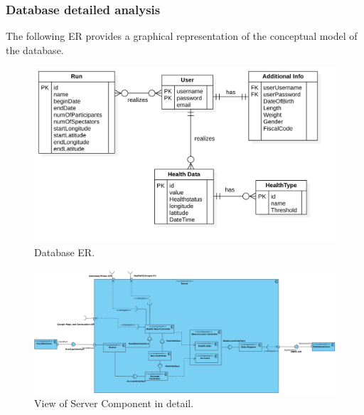 \documentclass[12pt]{article}
\begin{document}
\subsubsection{Database detailed analysis}
The following ER provides a graphical representation of the conceptual model of the database.
\vspace{20mm}

\begin{figure}[H]
\centering
\centerline{\includegraphics[scale=0.4]{databaseTrackMe.png}}
\caption{Database ER.}
\label{fig:databaseTrackMe}
\end{figure}



\begin{figure}[H]
\centering
\centerline{\includegraphics[scale=0.33, angle=-90,origin=c]{serverComponentView.png}}
\caption{View of Server Component in detail.}
\label{fig:serverComponentView}
\end{figure}
\end{document}
